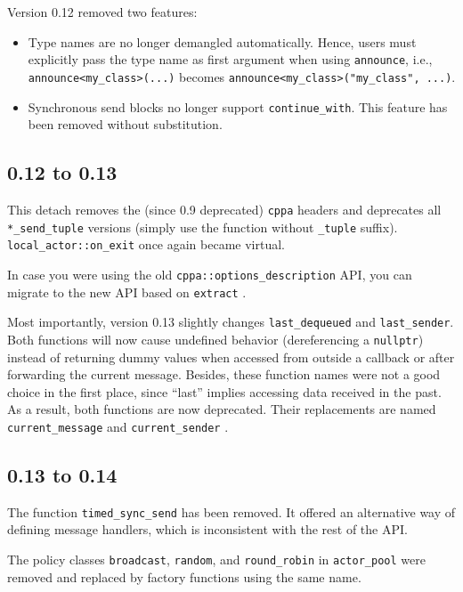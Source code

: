Version 0.12 removed two features:

\begin{itemize}
\item Type names are no longer demangled automatically. Hence, users must
  explicitly pass the type name as first argument when using
    \lstinline^announce^, i.e., \lstinline^announce<my_class>(...)^ becomes
    \lstinline^announce<my_class>("my_class", ...)^.
\item Synchronous send blocks no longer support \lstinline^continue_with^. This
  feature has been removed without substitution.
\end{itemize}

\subsection{0.12 to 0.13}

This detach removes the (since 0.9 deprecated) \lstinline^cppa^ headers and
deprecates all \lstinline^*_send_tuple^ versions (simply use the function
without \lstinline^_tuple^ suffix). \lstinline^local_actor::on_exit^ once again
became virtual.

In case you were using the old \lstinline^cppa::options_description^ API, you
can migrate to the new API based on \lstinline^extract^ .

Most importantly, version 0.13 slightly changes \lstinline^last_dequeued^ and
\lstinline^last_sender^. Both functions will now cause undefined behavior
(dereferencing a \lstinline^nullptr^) instead of returning dummy values when
accessed from outside a callback or after forwarding the current message.
Besides, these function names were not a good choice in the first place, since
``last'' implies accessing data received in the past. As a result, both
functions are now deprecated. Their replacements are named
\lstinline^current_message^ and \lstinline^current_sender^ .

\subsection{0.13 to 0.14}

The function \lstinline^timed_sync_send^ has been removed. It offered an
alternative way of defining message handlers, which is inconsistent with the
rest of the API.

The policy classes \lstinline^broadcast^, \lstinline^random^, and
\lstinline^round_robin^ in \lstinline^actor_pool^ were removed and replaced by
factory functions using the same name.

